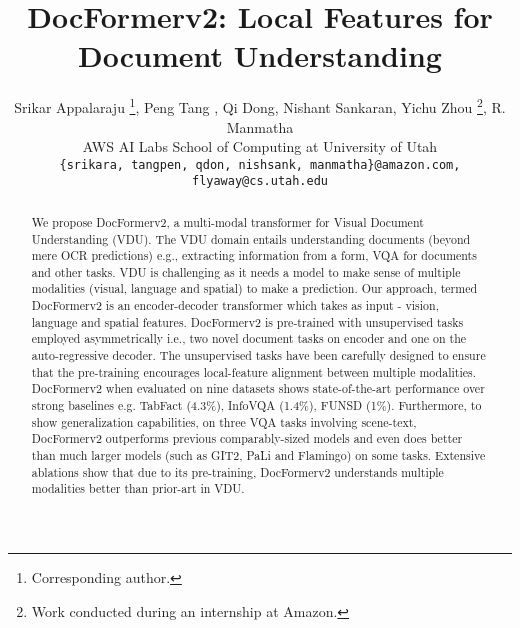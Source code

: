 \documentclass[10pt,twocolumn,letterpaper]{article}
\begin{document}
\title{DocFormerv2: Local Features for Document Understanding}

\author{Srikar Appalaraju \thanks{Corresponding author.}, \quad Peng Tang , \quad Qi Dong, \quad Nishant Sankaran, Yichu Zhou \thanks{Work conducted during an internship at Amazon.}, \quad R. Manmatha \\
 AWS AI Labs \quad
 School of Computing at University of Utah\\
{\tt\small \{srikara, tangpen, qdon, nishsank, manmatha\}@amazon.com, flyaway@cs.utah.edu}
}

\maketitle
\ificcvfinal\thispagestyle{empty}\fi


\newcommand{\xrightarrowdbl}[2][]{\leftarrow\mathrel{\mkern-14mu}\xrightarrow[#1]{#2}
}
\newcommand{\papertitle}{DocFormerv2 }
\newcommand{\papertitlenospace}{DocFormerv2}
\newcommand{\papertitleshort}{DFv2 }
\newcommand{\papertitleshortnospace}{DFv2}
\renewcommand\theadset{\def\arraystretch{.85}}


\begin{abstract}
   We propose \papertitlenospace, a multi-modal transformer for Visual Document Understanding (VDU). The VDU domain entails understanding documents (beyond mere OCR predictions) e.g., extracting information from a form, VQA for documents and other tasks. VDU is challenging as it needs a model to make sense of multiple modalities (visual, language and spatial) to make a prediction. Our approach, termed \papertitle is an encoder-decoder transformer which takes as input - vision, language and spatial features. \papertitle is pre-trained with unsupervised tasks employed asymmetrically i.e., two novel document tasks on encoder and one on the auto-regressive decoder. The unsupervised tasks have been carefully designed to ensure that the pre-training encourages local-feature alignment between multiple modalities. \papertitle when evaluated on nine  datasets shows state-of-the-art performance over strong baselines e.g. TabFact (4.3\%), InfoVQA (1.4\%), FUNSD (1\%). Furthermore, to show generalization capabilities, on three VQA tasks involving scene-text, \papertitle outperforms previous comparably-sized models and even does better than much larger models (such as GIT2, PaLi and Flamingo) on some tasks.
    Extensive ablations show that due to its pre-training, \papertitle understands multiple modalities better than prior-art in VDU.
\end{abstract}
\vspace{-2em}
\end{document}
